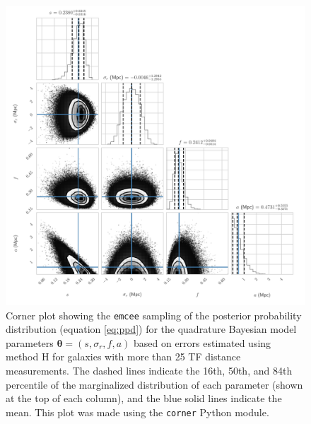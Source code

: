 \documentclass[a4paper,fleqn,usenatbib]{mnras}
\begin{document}
\begin{figure}
	\includegraphics[scale=0.7]{cornerq}
    \caption{Corner plot showing the \texttt{emcee} sampling of the posterior probability distribution (equation \ref{eq:ppd}) for the quadrature Bayesian model parameters $\pmb{\theta}=(s,\sigma_r,f,a)$ based on errors estimated using method H for galaxies with more than 25 TF distance measurements. The dashed lines indicate the 16th, 50th, and 84th percentile of the marginalized distribution of each parameter (shown at the top of each column), and the blue solid lines indicate the mean. This plot was made using the \texttt{corner} Python module.}
    \label{fig:cornerq}
\end{figure}
\end{document}
